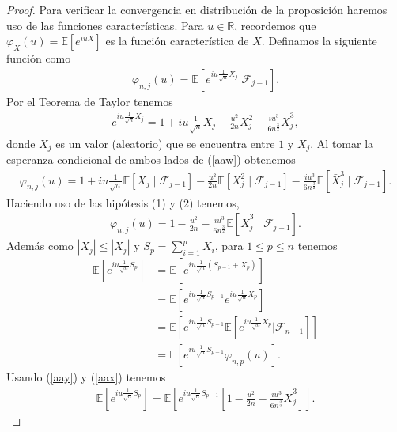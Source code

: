\begin{proof}
Para verificar la convergencia en distribución de la proposición haremos uso de las funciones características. Para $u \in \mathbb{R}$, recordemos que $\varphi_X (u) = \mathbb{E}[e^{iuX}]$ es la función característica de $X$. Definamos la siguiente función  como
	\begin{align*}
	\varphi_{n, j} (u) = \mathbb{E}\left[e^{iu \frac{1}{\sqrt{n}} X_j} \bigg| \mathcal{F}_{j-1}\right].
	\end{align*}
Por el Teorema de Taylor \cite[p.~358]{apostol} tenemos
	\begin{align}
	e^{iu \frac{1}{\sqrt{n}} X_j} = 1 + iu \frac{1}{\sqrt{n}} X_j - \frac{u^2}{2n} X_j^2 - \frac{iu^3}{6n^{\frac{3}{2}}} \bar{X}_j^3, \label{aaw}
	\end{align}
donde $\bar{X}_j$ es un valor (aleatorio) que se encuentra entre $1$ y $X_j$. Al tomar la esperanza condicional de ambos lados de (\ref{aaw}) obtenemos
	\begin{align*}
	\varphi_{n, j} (u) = 1 + iu \frac{1}{\sqrt{n}} \mathbb{E}[X_j \mid \mathcal{F}_{j-1}] - \frac{u^2}{2n} \mathbb{E}[X_j^2 \mid \mathcal{F}_{j-1}] - \frac{iu^3}{6n^{\frac{3}{2}}} \mathbb{E}[\bar{X}_j^3 \mid \mathcal{F}_{j-1}].
	\end{align*}
Haciendo uso de las hipótesis (1) y (2) tenemos,
	\begin{align}
	\varphi_{n, j} (u) = 1 - \frac{u^2}{2n} - \frac{iu^3}{6n^{\frac{3}{2}}} \mathbb{E}[\bar{X}_j^3 \mid \mathcal{F}_{j-1}]. \label{aax}
	\end{align}
Además como $|\bar{X}_j| \leq |X_j|$ y $S_p = \sum_{i=1}^p X_i$, para $1 \leq p \leq n$ tenemos
	\begin{align}
	\mathbb{E}\left[e^{iu \frac{1}{\sqrt{n}} S_p} \right] & = \mathbb{E}\left[e^{iu \frac{1}{\sqrt{n}} (S_{p-1} + X_p) } \right] \label{aay} \\
	& = \mathbb{E}\left[e^{iu \frac{1}{\sqrt{n}} S_{p-1}} e^{iu \frac{1}{\sqrt{n}} X_p} \right] \nonumber \\ 
	& = \mathbb{E}\left[e^{iu \frac{1}{\sqrt{n}} S_{p-1}} \mathbb{E}\left[e^{iu \frac{1}{\sqrt{n}} X_p} \bigg| \mathcal{F}_{n-1} \right]\right] \nonumber \\ 
	& = \mathbb{E}\left[e^{iu \frac{1}{\sqrt{n}} S_{p-1}} \varphi_{n, p} (u) \right] \nonumber.
	\end{align}
Usando (\ref{aay}) y (\ref{aax}) tenemos
	\begin{align*}
	\mathbb{E}\left[e^{iu \frac{1}{\sqrt{n}} S_p} \right] = \mathbb{E}\left[e^{iu \frac{1}{\sqrt{n}} S_{p-1}} \left[ 1 - \frac{u^2}{2n} - \frac{iu^3}{6n^{\frac{3}{2}}} \bar{X}_j^3 \right]\right].

\end{align*}
\end{proof}
